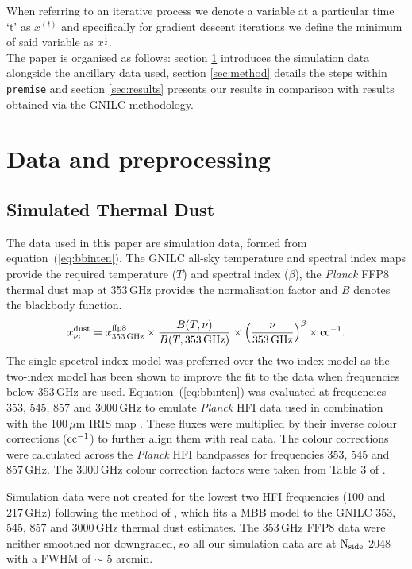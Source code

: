 \documentclass[a4paper,fleqn,usenatbib]{mnras}
\begin{document}
When referring to an iterative process we denote a variable at a particular time `t' as $x^{(t)}$ and specifically for gradient descent iterations we define the minimum of said variable as $x^{\frac{1}{2}}$.  \\
 
The paper is organised as follows: section \ref{sec:data} introduces the simulation data alongside the ancillary data used, section \ref{sec:method} details the steps within {\texttt{premise}} and section \ref{sec:results} presents our results in comparison with results obtained via the GNILC methodology.  

\section{Data and preprocessing}
\label{sec:data}
\subsection{Simulated Thermal Dust}
The data used in this paper are simulation data, formed from equation~(\ref{eq:bbinten}).
The GNILC \footnotemark  all-sky temperature and spectral index maps provide the required temperature ($T$)
 and spectral index ($\beta$), the {\it{Planck}} FFP8 \citep{ffp} thermal dust map at 353\,GHz provides the normalisation factor and $B$ denotes the blackbody function.  
\begin{eqnarray}
x_{\nu_{i}} ^{\rm{dust}} = x_{353\, \rm{GHz}}^{\rm{ffp8}} \times \frac{B(T,  \nu)}{B(T, 353 \, \rm{GHz})} \times
    \left(\frac{\nu}{353 \, \rm{GHz}}\right)^{\beta} \times \rm{cc}^{-1}.
\label{eq:bbinten}
\end{eqnarray}
The single spectral index model was preferred over the two-index model \citep{meis} as the two-index model has been shown to improve the fit to the data when frequencies below 353\,GHz are used. Equation~(\ref{eq:bbinten}) was evaluated at frequencies 353, 545, 857 and 3000\,GHz to emulate {\it{Planck}} HFI data used in combination with the 100\,$\mu$m IRIS map \citep{iris}. These fluxes were multiplied by their inverse colour corrections ($\rm{cc}^{-1}$) to further align them with real data. The colour corrections were calculated across the {\it{Planck}} HFI bandpasses for frequencies 353, 545 and 857\,GHz. The 3000\,GHz colour correction factors were taken from Table 3 of \citet{iris}. 

Simulation data were not created for the lowest two HFI frequencies (100 and 217\,GHz) following the method of \citep{gnilc}, which fits a MBB model to the GNILC 353, 545, 857 and 3000\,GHz thermal dust estimates. The 353\,GHz FFP8 data were neither smoothed nor downgraded, so all our simulation data are at $\rm{N_{side}}$ 2048 with a FWHM of $\sim$ 5 arcmin. 
\end{document}
